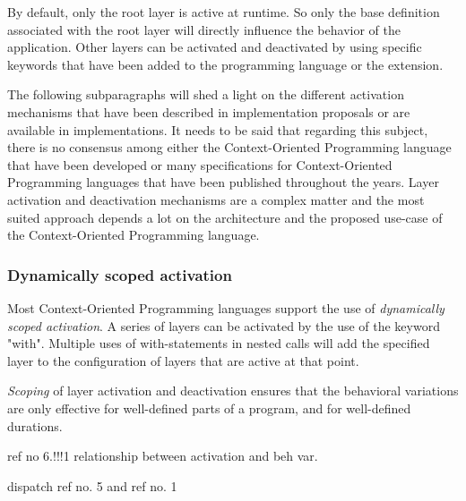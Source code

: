 \documentclass{acm_proc_article-sp}
\begin{document}
By default, only the root layer is active at runtime. So only the base definition associated with the root layer will directly influence the behavior of the application. Other layers can be activated and deactivated by using specific keywords that have been added to the programming language or the extension. 

\newpage
The following subparagraphs will shed a light on the different activation mechanisms that have been described in implementation proposals or are available in implementations. It needs to be said that regarding this subject, there is no consensus among either the Context-Oriented Programming language that have been developed or many specifications for Context-Oriented Programming languages that have been published throughout the years. Layer activation and deactivation mechanisms are a complex matter and the most suited approach depends a lot on the architecture and the proposed use-case of the Context-Oriented Programming language.

\subsubsection{Dynamically scoped activation}
\label{dynamically_scoped_activation}
Most Context-Oriented Programming languages support the use of \textit{dynamically scoped activation}. A series of layers can be activated by the use of the keyword "with". Multiple uses of with-statements in nested calls will add the specified layer to the configuration of layers that are active at that point. 

\textit{Scoping} of layer activation and deactivation ensures that
the behavioral variations are only effective for well-defined
parts of a program, and for well-defined durations.

ref no 6.!!!1 relationship between activation and beh var.

dispatch ref no. 5 and ref no. 1



\end{document}
